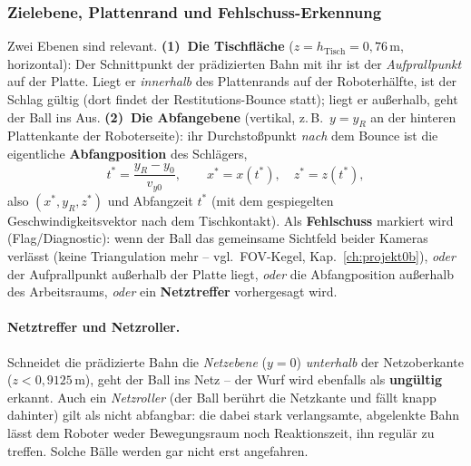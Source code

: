 \subsubsection{Zielebene, Plattenrand und Fehlschuss-Erkennung}
Zwei Ebenen sind relevant. \textbf{(1)~Die Tischfläche}
($z=h_{\text{Tisch}}=0{,}76\,$m, horizontal): Der Schnittpunkt der prädizierten
Bahn mit ihr ist der \emph{Aufprallpunkt} auf der Platte. Liegt er \emph{innerhalb}
des Plattenrands auf der Roboterhälfte, ist der Schlag gültig (dort findet der
Restitutions-Bounce statt); liegt er außerhalb, geht der Ball ins Aus.
\textbf{(2)~Die Abfangebene} (vertikal, z.\,B.\ $y=y_R$ an der hinteren
Plattenkante der Roboterseite): ihr Durchstoßpunkt \emph{nach} dem Bounce ist die
eigentliche \textbf{Abfangposition} des Schlägers,
\begin{equation}
t^\ast=\frac{y_R-y_0}{v_{y0}},\qquad x^\ast=x(t^\ast),\quad z^\ast=z(t^\ast),
\end{equation}
also $(x^\ast,y_R,z^\ast)$ und Abfangzeit $t^\ast$ (mit dem gespiegelten
Geschwindigkeitsvektor nach dem Tischkontakt). Als \textbf{Fehlschuss} markiert
wird (Flag/Diagnostic): wenn der Ball das gemeinsame Sichtfeld beider Kameras
verlässt (keine Triangulation mehr -- vgl.\ FOV-Kegel, Kap.~\ref{ch:projekt0b}),
\emph{oder} der Aufprallpunkt außerhalb der Platte liegt, \emph{oder} die
Abfangposition außerhalb des Arbeitsraums, \emph{oder} ein \textbf{Netztreffer}
vorhergesagt wird.

\paragraph{Netztreffer und Netzroller.} Schneidet die prädizierte Bahn die
\emph{Netzebene} ($y=0$) \emph{unterhalb} der Netzoberkante ($z<0{,}9125\,$m),
geht der Ball ins Netz -- der Wurf wird ebenfalls als \textbf{ungültig} erkannt.
Auch ein \emph{Netzroller} (der Ball berührt die Netzkante und fällt knapp
dahinter) gilt als nicht abfangbar: die dabei stark verlangsamte, abgelenkte Bahn
lässt dem Roboter weder Bewegungsraum noch Reaktionszeit, ihn regulär zu treffen.
Solche Bälle werden gar nicht erst angefahren.

